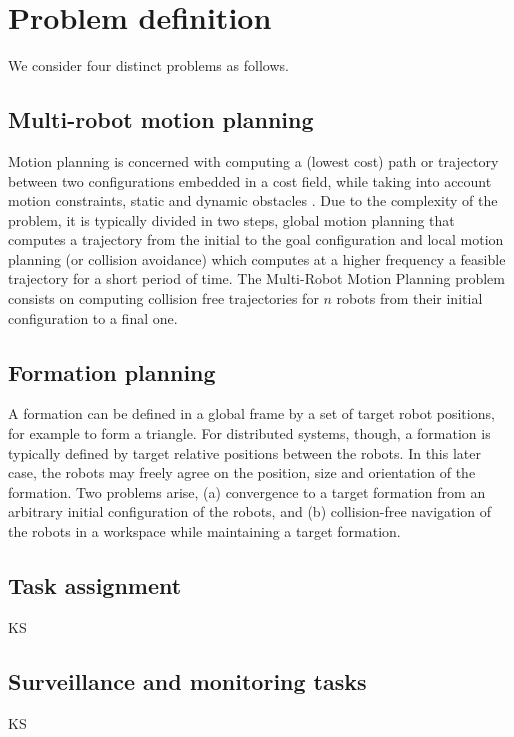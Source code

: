 
\section{Problem definition}\label{sec:2}

We consider four distinct problems as follows.

\subsection{Multi-robot motion planning}
Motion planning is concerned with computing a (lowest cost) path or trajectory between two configurations embedded in a cost field, while taking into account motion constraints, static and dynamic obstacles \citet{lavalle06}.
Due to the complexity of the problem, it is typically divided in two steps, global motion planning that computes a trajectory from the initial to the goal configuration and local motion planning (or collision avoidance) which computes at a higher frequency a feasible trajectory for a short period of time. The Multi-Robot Motion Planning problem consists on computing collision free trajectories for $n$ robots from their initial configuration to a final one.

\subsection{Formation planning}
A formation can be defined in a global frame by a set of target robot positions, for example to form a triangle. For distributed systems, though, a formation is typically defined by target relative positions between the robots. In this later case, the robots may freely agree on the position, size and orientation of the formation. Two problems arise, (a) convergence to a target formation from an arbitrary initial configuration of the robots, and (b) collision-free navigation of the robots in a workspace while maintaining a target formation.

\subsection{Task assignment}
KS

\subsection{Surveillance and monitoring tasks}
KS


